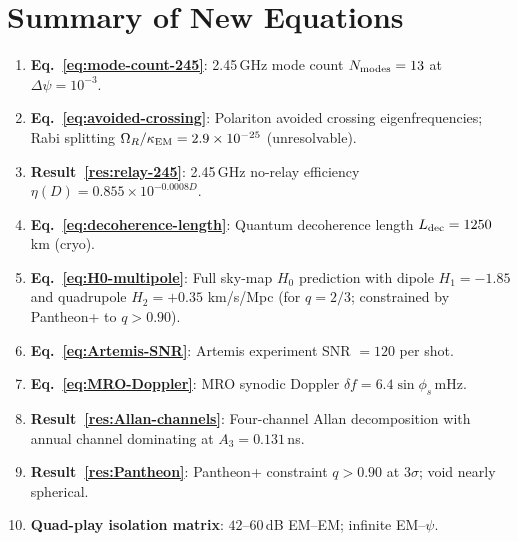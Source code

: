\documentclass[aps,prd,twocolumn,superscriptaddress]{revtex4-2}
\begin{document}
\section{Summary of New Equations}
\label{sec:equations-summary}

\begin{enumerate}
\item \textbf{Eq.~\eqref{eq:mode-count-245}}: 2.45\,GHz mode count
$N_{\rm modes} = 13$ at $\Delta\psi = 10^{-3}$.

\item \textbf{Eq.~\eqref{eq:avoided-crossing}}: Polariton avoided
crossing eigenfrequencies; Rabi splitting
$\Omega_R/\kappa_{\rm EM} = 2.9\times10^{-25}$ (unresolvable).

\item \textbf{Result~\ref{res:relay-245}}: 2.45\,GHz no-relay
efficiency $\eta(D) = 0.855\times10^{-0.0008D}$.

\item \textbf{Eq.~\eqref{eq:decoherence-length}}: Quantum
decoherence length $L_{\rm dec} = 1250$\,km (cryo).

\item \textbf{Eq.~\eqref{eq:H0-multipole}}: Full sky-map $H_0$
prediction with dipole $H_1 = -1.85$ and quadrupole $H_2 = +0.35$
km/s/Mpc (for $q = 2/3$; constrained by Pantheon+ to $q > 0.90$).

\item \textbf{Eq.~\eqref{eq:Artemis-SNR}}: Artemis experiment
SNR $= 120$ per shot.

\item \textbf{Eq.~\eqref{eq:MRO-Doppler}}: MRO synodic Doppler
$\delta f = 6.4\sin\phi_s$\,mHz.

\item \textbf{Result~\ref{res:Allan-channels}}: Four-channel Allan
decomposition with annual channel dominating at
$A_3 = 0.131$\,ns.

\item \textbf{Result~\ref{res:Pantheon}}: Pantheon+ constraint
$q > 0.90$ at $3\sigma$; void nearly spherical.

\item \textbf{Quad-play isolation matrix}: $42$--$60$\,dB EM--EM;
infinite EM--$\psi$.
\end{enumerate}
\end{document}
